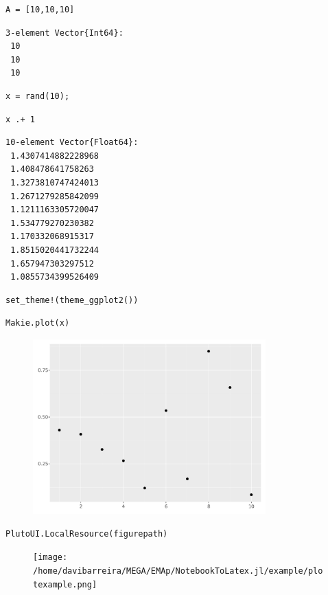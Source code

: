 \begin{lstlisting}[language=JuliaLocal, style=julia]
A = [10,10,10]
\end{lstlisting}

\begin{verbatim}
3-element Vector{Int64}:
 10
 10
 10
\end{verbatim}

\begin{lstlisting}[language=JuliaLocal, style=julia]
x = rand(10);
\end{lstlisting}

\begin{lstlisting}[language=JuliaLocal, style=julia]
x .+ 1
\end{lstlisting}

\begin{verbatim}
10-element Vector{Float64}:
 1.4307414882228968
 1.408478641758263
 1.3273810747424013
 1.2671279285842099
 1.1211163305720047
 1.534779270230382
 1.170332068915317
 1.8515020441732244
 1.657947303297512
 1.0855734399526409
\end{verbatim}

\begin{lstlisting}[language=JuliaLocal, style=julia]
set_theme!(theme_ggplot2())
\end{lstlisting}

\begin{lstlisting}[language=JuliaLocal, style=julia]
Makie.plot(x)
\end{lstlisting}

\begin{figure}[H]
	\centering
	\includegraphics[width=0.8\textwidth]{./figures/examplepluto_figure2.pdf}
	\label{fig:examplepluto_figure2.pdf}

\end{figure}

\begin{lstlisting}[language=JuliaLocal, style=julia]
PlutoUI.LocalResource(figurepath)
\end{lstlisting}

\begin{figure}[H]
	\centering
	\texttt{[image: /home/davibarreira/MEGA/EMAp/NotebookToLatex.jl/example/plotexample.png]}
	\label{fig:/home/davibarreira/MEGA/EMAp/NotebookToLatex.jl/example/plotexample.png}

\end{figure}
